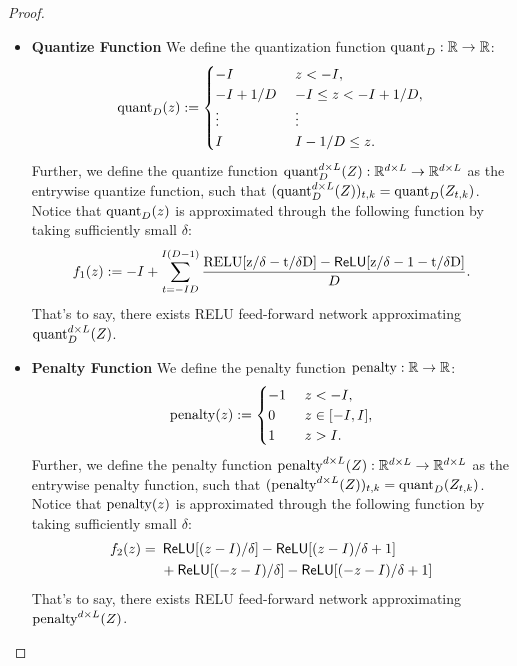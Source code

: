 \documentclass[12pt]{article}
\numberwithin{equation}{section}
\newcommand{\ReLU}{\mathop{\mathsf{ReLU}}}
\def\R{\mathbb{R}}
\theoremstyle{theoremstyle}
\numberwithin{equation}{section}
\numberwithin{theorem}{section}
\numberwithin{proposition}{section}
\numberwithin{definition}{section}
\numberwithin{lemma}{section}
\numberwithin{assumption}{section}
\numberwithin{remark}{section}
\begin{document}
\begin{proof}
\begin{itemize}
\item \textbf{Quantize Function} 
We define the quantization function ${\rm quant}_D:\R\to \R$:
\begin{align*}
    {\rm quant}_D(z):=
    \begin{cases}
    -I & ~ z<-I, \\
    -I+1/D & ~ -I\leq z <-I+1/D, \\
    \vdots & ~ \vdots \\
    I & ~ I-1/D\leq z.
    \end{cases}
\end{align*}
Further, we define the quantize function ${\rm quant}^{d\times L}_D(Z):\R^{d\times L}\to \R^{d\times L}$ as the entrywise quantize function, such that $({\rm quant}^{d\times L}_D(Z))_{t,k}={\rm quant}_D(Z_{t,k})$.
Notice that ${\rm quant}_D(z)$ is approximated through the following function by taking sufficiently small $\delta$:
\begin{align}\label{eq:quantization_part_quant_approximation_construction}
    f_1(z):=-I+\sum_{t=-ID}^{I(D-1)}\frac{\rm RELU[z/\delta-t/\delta D]-\ReLU[z/\delta-1-t/\delta D]}{D}.
\end{align}
That's to say, there exists RELU feed-forward network approximating ${\rm quant}^{d\times L}_D(Z)$.

\item \textbf{Penalty Function} 
We define the penalty function ${\rm penalty}:\R\to \R$:
\begin{align*}
    {\rm penalty}(z):=
    \begin{cases}
    -1 & ~ z<-I, \\
    0 & ~ z\in[-I,I], \\
    1 & ~ z>I.
    \end{cases}
\end{align*}
Further, we define the penalty function ${\rm penalty}^{d\times L}(Z):\R^{d\times L}\to \R^{d\times L}$ as the entrywise penalty function, such that $({\rm penalty}^{d\times L}(Z))_{t,k}={\rm quant}_D(Z_{t,k})$.
Notice that ${\rm penalty}(z)$ is approximated through the following function by taking sufficiently small $\delta$:
\begin{align}\label{eq:quantization_part_penalty_approximation_construction}
    f_2(z)= & ~\ReLU[(z-I)/\delta]-\ReLU[(z-I)/\delta+1]\notag\\
    & ~ +
    \ReLU[(-z-I)/\delta]-\ReLU[(-z-I)/\delta+1]
\end{align}
That's to say, there exists RELU feed-forward network approximating ${\rm penalty}^{d\times L}(Z)$.
\end{itemize}


\end{proof}
\end{document}
